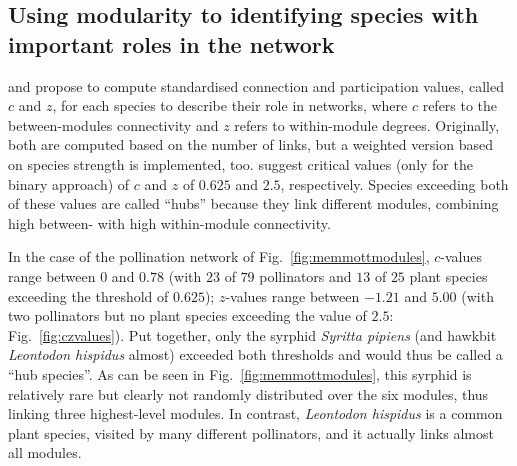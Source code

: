 \documentclass[a4paper, 11pt]{article}\usepackage[]{graphicx}\usepackage[]{color}
\begin{document}
\subsection{Using modularity to identifying species with important roles in the network}
\citet{Guimera2005} and \citet{Olesen2007} propose to compute standardised connection and participation values, called $c$ and $z$, for each species to describe their role in networks, where $c$ refers to the between-modules connectivity \citep[called ``participation coefficient'' $P$][]{Guimera2005} and $z$ refers to within-module degrees. Originally, both are computed based on the number of links, but a weighted version based on species strength is implemented, too. \citet{Guimera2005} suggest critical values (only for the binary approach) of $c$ and $z$ of $0.625$ and $2.5$, respectively. Species exceeding both of these values are called ``hubs'' because they link different modules, combining high between- with high within-module connectivity. 

In the case of the pollination network of Fig.~\ref{fig:memmottmodules}, $c$-values range between $0$ and $0.78$ (with $23$ of $79$ pollinators and $13$ of $25$ plant species exceeding the threshold of $0.625$); $z$-values range between $-1.21$ and $5.00$ (with two pollinators but no plant species exceeding the value of $2.5$: Fig.~\ref{fig:czvalues}). Put together, only the syrphid \emph{Syritta pipiens} (and hawkbit \emph{Leontodon hispidus} almost) exceeded both thresholds and would thus be called a ``hub species''. As can be seen in Fig.~\ref{fig:memmottmodules}, this syrphid is relatively rare but clearly not randomly distributed over the six modules, thus linking three highest-level modules. In contrast, \emph{Leontodon hispidus} is a common plant species, visited by many different pollinators, and it actually links almost all modules. 
\end{document}
